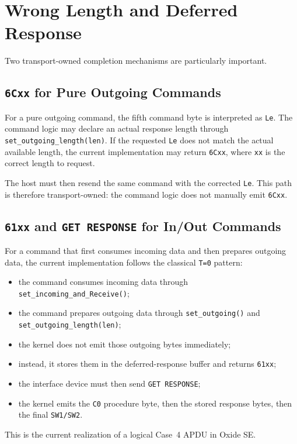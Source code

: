 \section{Wrong Length and Deferred Response}

Two transport-owned completion mechanisms are particularly important.

\subsection{\texttt{6Cxx} for Pure Outgoing Commands}

For a pure outgoing command, the fifth command byte is interpreted as
\texttt{Le}. The command logic may declare an actual response length
through \texttt{set\_outgoing\_length(len)}. If the requested
\texttt{Le} does not match the actual available length, the current
implementation may return \texttt{6Cxx}, where \texttt{xx} is the
correct length to request.

The host must then resend the same command with the corrected
\texttt{Le}. This path is therefore transport-owned: the command logic
does not manually emit \texttt{6Cxx}.

\subsection{\texttt{61xx} and \texttt{GET RESPONSE} for In/Out Commands}

For a command that first consumes incoming data and then prepares
outgoing data, the current implementation follows the classical
\texttt{T=0} pattern:
\begin{itemize}
\item the command consumes incoming data through
  \texttt{set\_incoming\_and\_Receive()};
\item the command prepares outgoing data through
  \texttt{set\_outgoing()} and \texttt{set\_outgoing\_length(len)};
\item the kernel does not emit those outgoing bytes immediately;
\item instead, it stores them in the deferred-response buffer and
  returns \texttt{61xx};
\item the interface device must then send \texttt{GET RESPONSE};
\item the kernel emits the \texttt{C0} procedure byte, then the stored
  response bytes, then the final \texttt{SW1/SW2}.
\end{itemize}

This is the current realization of a logical Case~4 APDU in Oxide SE.

